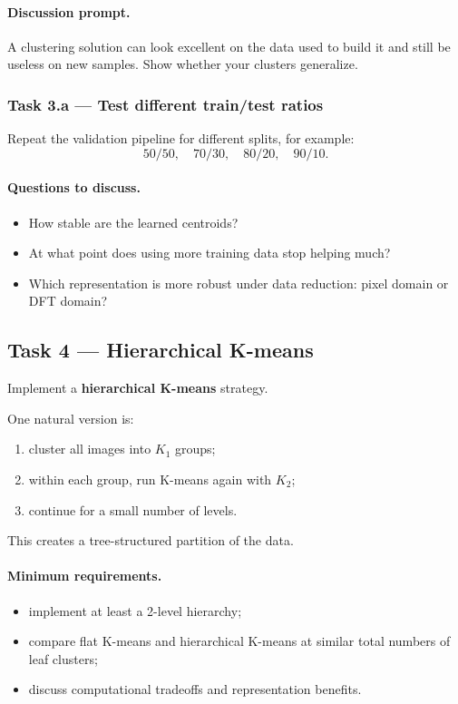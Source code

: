 \documentclass[11pt]{article}
\begin{document}
\paragraph{Discussion prompt.}
A clustering solution can look excellent on the data used to build it and still be useless on new samples. Show whether your clusters generalize.

\subsubsection*{Task 3.a --- Test different train/test ratios}

Repeat the validation pipeline for different splits, for example:
\[
50/50,\quad 70/30,\quad 80/20,\quad 90/10.
\]

\paragraph{Questions to discuss.}
\begin{itemize}[itemsep=2pt]
    \item How stable are the learned centroids?
    \item At what point does using more training data stop helping much?
    \item Which representation is more robust under data reduction: pixel domain or DFT domain?
\end{itemize}

\subsection*{Task 4 --- Hierarchical K-means}

Implement a \textbf{hierarchical K-means} strategy.

One natural version is:
\begin{enumerate}[itemsep=2pt]
    \item cluster all images into \(K_1\) groups;
    \item within each group, run K-means again with \(K_2\);
    \item continue for a small number of levels.
\end{enumerate}

This creates a tree-structured partition of the data.

\paragraph{Minimum requirements.}
\begin{itemize}[itemsep=2pt]
    \item implement at least a 2-level hierarchy;
    \item compare flat K-means and hierarchical K-means at similar total numbers of leaf clusters;
    \item discuss computational tradeoffs and representation benefits.
\end{itemize}
\end{document}
